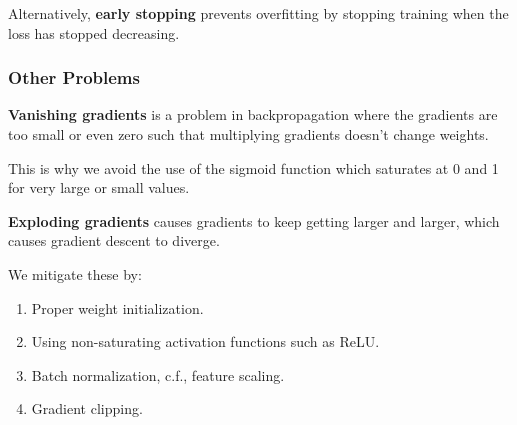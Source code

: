 Alternatively, \textbf{early stopping} prevents overfitting by stopping training
when the loss has stopped decreasing.

\subsubsection{Other Problems}
\textbf{Vanishing gradients} is a problem in backpropagation where the gradients
are too small or even zero such that multiplying gradients doesn't change weights.

This is why we avoid the use of the sigmoid function which saturates at 0 and 1
for very large or small values.

\textbf{Exploding gradients} causes gradients to keep getting larger and larger,
which causes gradient descent to diverge.

We mitigate these by:
\begin{enumerate}
    \item Proper weight initialization.
    \item Using non-saturating activation functions such as ReLU.
    \item Batch normalization, c.f., feature scaling.
    \item Gradient clipping.
\end{enumerate}
